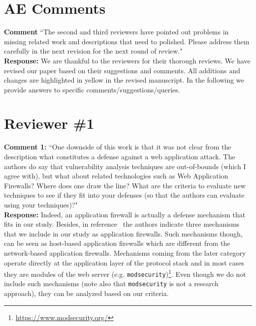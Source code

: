 \documentclass[10pt,journal,compsoc]{IEEEtran}
\begin{document}
\maketitle

\IEEEdisplaynontitleabstractindextext

\IEEEpeerreviewmaketitle

\section{AE Comments}
\label{sec:ae}

{\bf Comment} ``The second and third reviewers
have pointed out problems in missing related work and
descriptions that need to polished.
Please address them carefully in the next revision
for the next round of review."\\

\noindent
{\bf Response:}
We are thankful to the reviewers for their thorough reviews.
We have revised our paper based on their suggestions and comments.
All additions and changes are highlighted in yellow
in the revised manuscript.
In the following we provide answers to specific
comments/suggestions/queries.\\

\section{Reviewer \#1}
\label{sec:r1}

{\bf Comment 1:} ``One downside of this work is that it was not clear from the
description what constitutes a defense against a web application
attack. The authors do say that vulnerability analysis techniques are
out-of-bounds (which I agree with), but what about related
technologies such as Web Application Firewalls? Where does one draw
the line? What are the criteria to evaluate new techniques to see if
they fit into your defenses (so that the authors can evaluate using
your techniques)?"\\

\noindent
{\bf Response:}
Indeed,
an application firewall is actually a defense
mechanism that fits in our study.
Besides,
in reference~\cite{DPJV06}
the authors indicate three mechanisms~\cite{BK04,PB05,HO05b}
that we include in our study as
application firewalls.
Such mechanisms though,
can be seen as host-based application firewalls
which are different from the network-based
application firewalls.
Mechanisms coming from the later category
operate directly at the application
layer of the protocol stack and
in most cases they are modules
of the web server
(e.g. {\tt modsecurity})\footnote{\url{https://www.modsecurity.org/}}.
Even though we do not include such mechanisms
(note also that {\tt modsecurity} is
not a research approach),
they can be analyzed based on our criteria.\\
\end{document}
